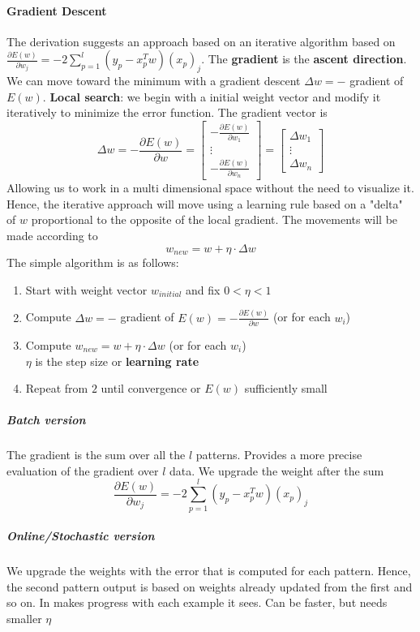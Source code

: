 \documentclass[10pt]{report}
\begin{document}
\paragraph{Gradient Descent} The derivation suggests an approach based on an iterative algorithm based on\\$\frac{\partial E(w)}{\partial w_j} = -2 \sum_{p=1}^l (y_p - x_p^T w)(x_p)_j$. The \textbf{gradient} is the \textbf{ascent direction}. We can move toward the minimum with a gradient descent $\Delta w = -$ gradient of $E(w)$. \textbf{Local search}: we begin with a initial weight vector and modify it iteratively to minimize the error function. The gradient vector is
$$\Delta w = -\frac{\partial E(w)}{\partial w} = \left[\begin{array}{c}
-\frac{\partial E(w)}{\partial w_1}\\\vdots\\-\frac{\partial E(w)}{\partial w_n}
\end{array}\right] = \left[\begin{array}{c}
\Delta w_1\\\vdots\\\Delta w_n
\end{array} \right]$$
Allowing us to work in a multi dimensional space without the need to visualize it. Hence, the iterative approach will move using a learning rule based on a "delta" of $w$ proportional to the opposite of the local gradient. The movements will be made according to $$w_{new} = w + \eta\cdot\Delta w$$
The simple algorithm is as follows:
\begin{enumerate}
	\item Start with weight vector $w_{initial}$ and fix $0 < \eta < 1$
	\item Compute $\Delta w = -$ gradient of $E(w) = -\frac{\partial E(w)}{\partial w}$ (or for each $w_i$)
	\item Compute $w_{new} = w + \eta\cdot\Delta w$ (or for each $w_i$)\\
	$\eta$ is the step size or \textbf{learning rate}
	\item Repeat from $2$ until convergence or $E(w)$ sufficiently small
\end{enumerate}
\subparagraph{Batch version} The gradient is the sum over all the $l$ patterns. Provides a more precise evaluation of the gradient over $l$ data. We upgrade the weight after the sum
$$\frac{\partial E(w)}{\partial w_j} = -2 \sum_{p=1}^l (y_p - x_p^T w)(x_p)_j$$
\subparagraph{Online/Stochastic version} We upgrade the weights with the error that is computed for each pattern. Hence, the second pattern output is based on weights already updated from the first and so on. In makes progress with each example it sees. Can be faster, but needs smaller $\eta$
\end{document}
